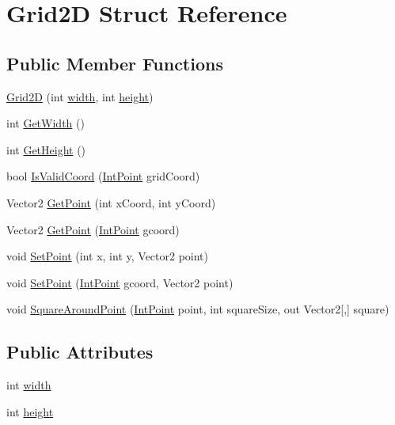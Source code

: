 \hypertarget{struct_grid2_d}{}\section{Grid2D Struct Reference}
\label{struct_grid2_d}
\subsection*{Public Member Functions}
\begin{DoxyCompactItemize}
\item 
\mbox{\hyperlink{struct_grid2_d_a8ab64aa29a75f6612241c1c6ed7d8880}{Grid2D}} (int \mbox{\hyperlink{struct_grid2_d_abe3dc5ac69835aa5f571338fbb6b5d8e}{width}}, int \mbox{\hyperlink{struct_grid2_d_ae7a732a224d7276592bbca106154016d}{height}})
\item 
int \mbox{\hyperlink{struct_grid2_d_a87f97756b42b798f0fb888407a42db7c}{Get\+Width}} ()
\item 
int \mbox{\hyperlink{struct_grid2_d_a87d2a1dc516b61b520b05a07d6af5cf7}{Get\+Height}} ()
\item 
bool \mbox{\hyperlink{struct_grid2_d_a5bab1dc86bbc11873dbea422b83c01e2}{Is\+Valid\+Coord}} (\mbox{\hyperlink{struct_int_point}{Int\+Point}} grid\+Coord)
\item 
Vector2 \mbox{\hyperlink{struct_grid2_d_a080a049e035f44790cb7200518730f6c}{Get\+Point}} (int x\+Coord, int y\+Coord)
\item 
Vector2 \mbox{\hyperlink{struct_grid2_d_a5b34f0d8b83f9fa7148f42030efb7182}{Get\+Point}} (\mbox{\hyperlink{struct_int_point}{Int\+Point}} gcoord)
\item 
void \mbox{\hyperlink{struct_grid2_d_aef80a8514e645da44457a6a2e2bb4823}{Set\+Point}} (int x, int y, Vector2 point)
\item 
void \mbox{\hyperlink{struct_grid2_d_a81023ffc43b01d97edf0ced5d946763c}{Set\+Point}} (\mbox{\hyperlink{struct_int_point}{Int\+Point}} gcoord, Vector2 point)
\item 
void \mbox{\hyperlink{struct_grid2_d_a992f70ddc78c3f9f5bc025f53cfc2059}{Square\+Around\+Point}} (\mbox{\hyperlink{struct_int_point}{Int\+Point}} point, int square\+Size, out Vector2\mbox{[},\mbox{]} square)
\end{DoxyCompactItemize}
\subsection*{Public Attributes}
\begin{DoxyCompactItemize}
\item 
int \mbox{\hyperlink{struct_grid2_d_abe3dc5ac69835aa5f571338fbb6b5d8e}{width}}
\item 
int \mbox{\hyperlink{struct_grid2_d_ae7a732a224d7276592bbca106154016d}{height}}
\end{DoxyCompactItemize}


